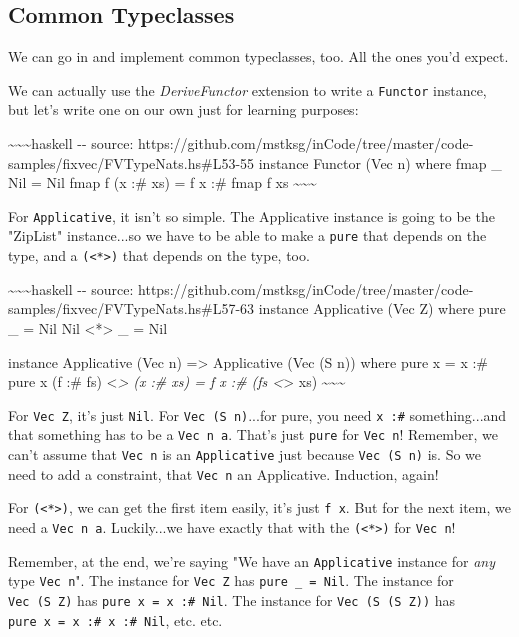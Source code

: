 \documentclass[]{article}
\begin{document}
\subsection{Common Typeclasses}

We can go in and implement common typeclasses, too. All the ones you'd expect.

We can actually use the \emph{DeriveFunctor} extension to write a
\texttt{Functor} instance, but let's write one on our own just for learning
purposes:

\textasciitilde{}\textasciitilde{}\textasciitilde{}haskell -\/- source:
https://github.com/mstksg/inCode/tree/master/code-samples/fixvec/FVTypeNats.hs\#L53-55
instance Functor (Vec n) where fmap \_ Nil = Nil fmap f (x :\# xs) = f x :\#
fmap f xs \textasciitilde{}\textasciitilde{}\textasciitilde{}

For \texttt{Applicative}, it isn't so simple. The Applicative instance is going
to be the "ZipList" instance...so we have to be able to make a \texttt{pure}
that depends on the type, and a \texttt{(\textless{}*\textgreater{})} that
depends on the type, too.

\textasciitilde{}\textasciitilde{}\textasciitilde{}haskell -\/- source:
https://github.com/mstksg/inCode/tree/master/code-samples/fixvec/FVTypeNats.hs\#L57-63
instance Applicative (Vec Z) where pure \_ = Nil Nil \textless{}*\textgreater{}
\_ = Nil

instance Applicative (Vec n) =\textgreater{} Applicative (Vec (S n)) where pure
x = x :\# pure x (f :\# fs) \textless{}\emph{\textgreater{} (x :\# xs) = f x :\#
(fs \textless{}}\textgreater{} xs)
\textasciitilde{}\textasciitilde{}\textasciitilde{}

For \texttt{Vec\ Z}, it's just \texttt{Nil}. For \texttt{Vec\ (S\ n)}...for
pure, you need \texttt{x\ :\#} something...and that something has to be a
\texttt{Vec\ n\ a}. That's just \texttt{pure} for \texttt{Vec\ n}! Remember, we
can't assume that \texttt{Vec\ n} is an \texttt{Applicative} just because
\texttt{Vec\ (S\ n)} is. So we need to add a constraint, that \texttt{Vec\ n} an
Applicative. Induction, again!

For \texttt{(\textless{}*\textgreater{})}, we can get the first item easily,
it's just \texttt{f\ x}. But for the next item, we need a \texttt{Vec\ n\ a}.
Luckily...we have exactly that with the \texttt{(\textless{}*\textgreater{})}
for \texttt{Vec\ n}!

Remember, at the end, we're saying "We have an \texttt{Applicative} instance for
\emph{any} type \texttt{Vec\ n}". The instance for \texttt{Vec\ Z} has
\texttt{pure\ \_\ =\ Nil}. The instance for \texttt{Vec\ (S\ Z)} has
\texttt{pure\ x\ =\ x\ :\#\ Nil}. The instance for \texttt{Vec\ (S\ (S\ Z))} has
\texttt{pure\ x\ =\ x\ :\#\ x\ :\#\ Nil}, etc. etc.
\end{document}
